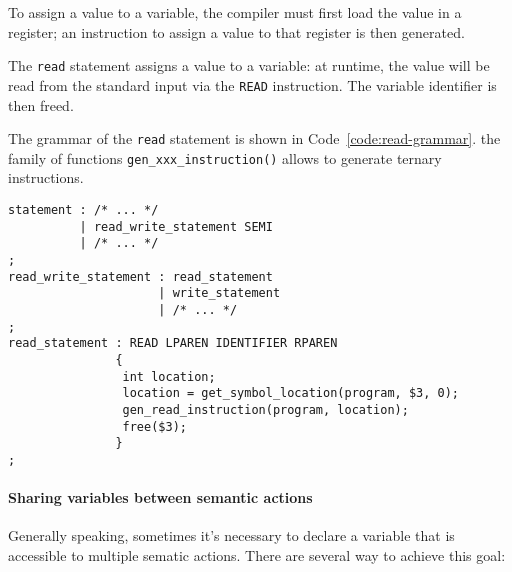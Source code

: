To assign a value to a variable, the compiler must first load the value in a register;
an instruction to assign a value to that register is then generated.

The \texttt{read} statement assigns a value to a variable:
at runtime, the value will be read from the standard input via the \texttt{READ} instruction.
The variable identifier is then freed.

The grammar of the \texttt{read} statement is shown in Code~\ref{code:read-grammar}.
the family of functions \texttt{gen\_xxx\_instruction()} allows to generate ternary instructions.

\begin{onepage}
  \begin{lstlisting}[language=LANCE, caption={Read grammar}, label={code:read-grammar}]
statement : /* ... */
          | read_write_statement SEMI
          | /* ... */
;
read_write_statement : read_statement
                     | write_statement
                     | /* ... */
;
read_statement : READ LPAREN IDENTIFIER RPAREN
               {
                int location;
                location = get_symbol_location(program, $3, 0);
                gen_read_instruction(program, location);
                free($3);
               }
;
\end{lstlisting}
\end{onepage}

\paragraph{Sharing variables between semantic actions}

Generally speaking, sometimes it's necessary to declare a variable that is accessible to multiple sematic actions.
There are several way to achieve this goal:

